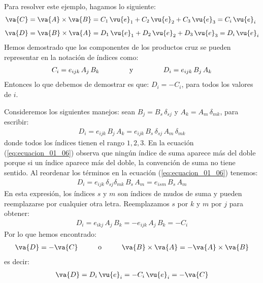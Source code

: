 Para resolver este ejemplo, hagamos lo siguiente:
\begin{align*}
\va{C} & = \va{A} \times \va{B} = C_{1} \, \vu{e}_{1} + C_{2} \, \vu{e}_{2} + C_{3} \, \vu{e}_{3} = C_{i} \, \vu{e}_{i} \\[0.5em]
\va{D} & = \va{B} \times \va{A} = D_{1} \, \vu{e}_{1} + D_{2} \, \vu{e}_{2} + D_{3} \, \vu{e}_{3} = D_{i} \, \vu{e}_{i}
\end{align*}
Hemos demostrado que los componentes de los productos cruz  se pueden representar en la notación de índices como:
\begin{align*}
    C_{i} = e_{ijk} \, A_{j} \, B_{k} \hspace{1.5cm} \mbox{y} \hspace{1.5cm} D_{i} = e_{ijk} \, B_{j} \, A_{k}
\end{align*}
Entonces lo que debemos de demostrar es que: $D_{i} = - C_{i}$, para todos los valores de $i$.
\par
Consideremos los siguientes manejos: sean $B_{j} = B_{s} \, \delta_{sj}$ y $A_{k} = A_{m} \, \delta_{mk}$, para escribir:
\begin{align}
    D_{i} = e_{ijk} \, B_{j} \, A_{k} = e_{ijk} \, B_{s} \, \delta_{sj} \, A_{m} \, \delta_{mk}
    \label{eq:ecuacion_01_06}
\end{align}
donde todos los índices tienen el rango $1, 2, 3$. En la ecuación (\ref{eq:ecuacion_01_06}) observa que ningún índice de suma aparece más del doble porque si un índice aparece más del doble, la convención de suma no tiene sentido. Al reordenar los términos en la ecuación (\ref{eq:ecuacion_01_06}) tenemos:
\begin{align*}
    D_{i} = e_{ijk} \, \delta_{sj} \delta_{mk} \, B_{s} \, A_{m} = e_{ism} \, B_{s} \, A_{m}
\end{align*}
En esta expresión, los índices $s$ y $m$ son índices de mudos de suma y pueden reemplazarse por cualquier otra letra. Reemplazamos $s$ por $k$ y $m$ por $j$ para obtener:
\begin{align*}
    D_{i} = e_{ikj} \, A_{j} \, B_{k} = - e_{ijk} \, A_{j} \, B_{k} = - C_{i}
\end{align*}
Por lo que hemos encontrado:
\begin{align*}
    \va{D} = - \va{C} \hspace{1cm} \mbox{o} \hspace{1cm} \va{B} \times \va{A} = - \va{A} \times \va{B}
\end{align*}
es decir:
\begin{align*}
    \va{D} = D_{i} \, \vu{e}_{i} = - C_{i} \, \vu{e}_{i} = - \va{C}
\end{align*}
